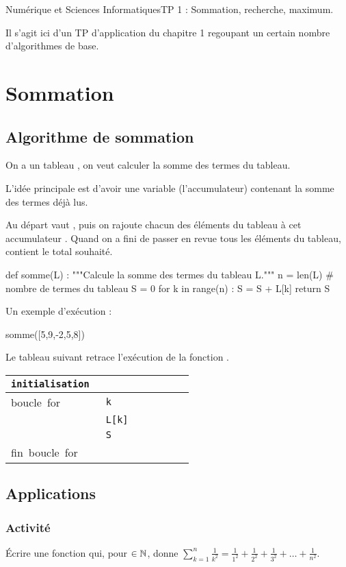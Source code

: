 \documentclass[11pt,a4paper,french,twoside]{PMCours}
\newcounter{activite}
\newcommand{\activite}{\subsubsection*{Activité~\refstepcounter{activite}\theactivite}}
\begin{document}
{Numérique et Sciences Informatiques}{TP 1 : Sommation, recherche, maximum.}

Il s'agit ici d'un TP d'application du chapitre 1 regoupant un certain nombre d'algorithmes de base.

\tableofcontents


\newpage

\section{Sommation}
\subsection{Algorithme de sommation}
On a un tableau , on veut calculer la somme des termes du tableau.

L'idée principale est d'avoir une variable  (l'accumulateur) contenant la
somme des termes déjà lus.

Au départ  vaut , puis on rajoute chacun des éléments du tableau à cet
accumulateur . Quand on a fini de passer en revue tous les éléments du
tableau,  contient le total souhaité.

\begin{Python}
def somme(L) :
    """Calcule la somme des termes du tableau L."""
    n = len(L) # nombre de termes du tableau
    S = 0
    for k in range(n) :
        S = S + L[k]
    return S
\end{Python}

Un exemple d'exécution :
\begin{Python*}
somme([5,9,-2,5,8])
\end{Python*}

Le tableau suivant retrace l'exécution de la fonction .

{\large \begin{tabular} {|l|p{1cm}|p{1cm}|p{1cm}|p{1cm}|p{1cm}|p{1cm}|}\hline
\verb|initialisation |&\multicolumn{6}{l|}{}\\ \hline
\mbox{boucle for}&\verb|k|& & & && \\ \hline
&\verb|L[k]|& & && & \\ \hline
&\verb|S|& & && & \\ \hline
\mbox{fin boucle for}&\multicolumn{6}{l|}{}\\ \hline
 \end{tabular}}
 
\medskip
\subsection{Applications}
\activite
Écrire une fonction  qui, pour $\in\operatorname{\mathbb{N}}$, donne
$\sum_{k=1}^n\frac{1}{k^2}=\frac{1}{1^2}+\frac{1}{2^2}+\frac{1}{3^2}+\ldots
+\frac{1}{n^2}$.
	
\end{document}
